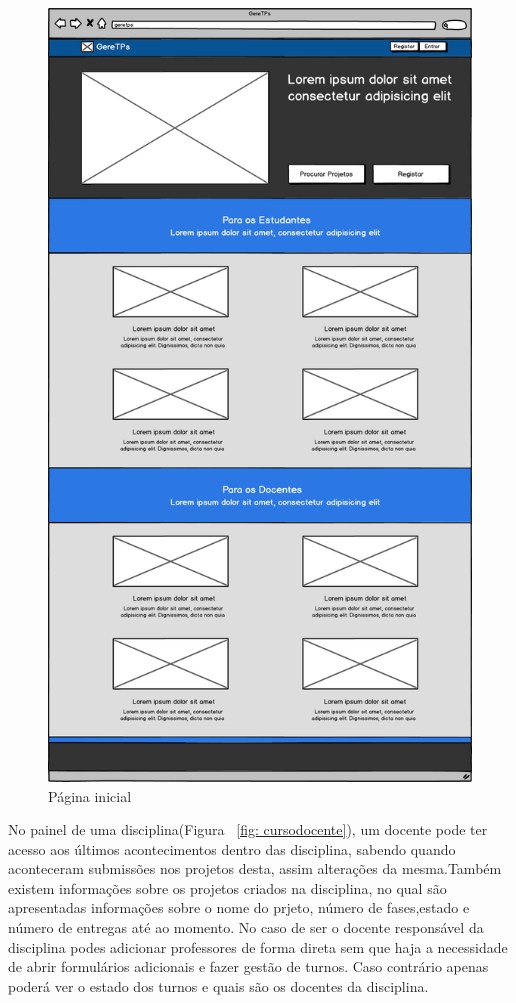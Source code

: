 \begin{figure}[htbp]
        \centering
        \includegraphics[width=1\textwidth]{images/prototipos/mockups/home.png}
         \caption{Página inicial}
         \label{fig: home}
\end{figure}

No painel de uma disciplina(Figura ~\ref{fig: cursodocente}), um docente pode ter acesso aos últimos acontecimentos dentro das disciplina, sabendo quando aconteceram submissões nos projetos desta, assim alterações da mesma.Também existem informações sobre os projetos criados na disciplina, no qual são apresentadas informações sobre o nome do prjeto, número de fases,estado e número de entregas até ao momento. No caso de ser o docente responsável da disciplina podes adicionar professores de forma direta sem que haja a necessidade de abrir formulários adicionais e fazer gestão de turnos. Caso contrário apenas poderá ver o estado dos turnos e quais são os docentes da disciplina.\\

